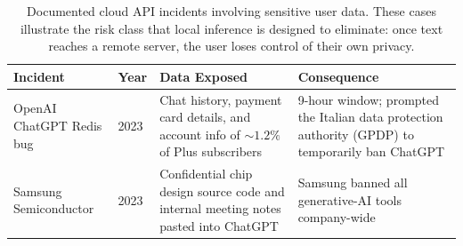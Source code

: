 \begin{table}[H]
\centering
\renewcommand{\arraystretch}{1.25}
\footnotesize
\begin{tabular}{p{3.2cm}p{1.2cm}p{4.8cm}p{4.2cm}}
\toprule
\textbf{Incident} & \textbf{Year} & \textbf{Data Exposed} & \textbf{Consequence} \\
\midrule
OpenAI ChatGPT Redis bug \cite{openai2023breach}
  & 2023
  & Chat history, payment card details, and account info of ${\sim}1.2\%$ of Plus subscribers
  & 9-hour window; prompted the Italian data protection authority (GPDP) to temporarily ban ChatGPT \\
Samsung Semiconductor \cite{bloomberg2023samsung}
  & 2023
  & Confidential chip design source code and internal meeting notes pasted into ChatGPT
  & Samsung banned all generative-AI tools company-wide \\
\bottomrule
\end{tabular}
\caption{Documented cloud API incidents involving sensitive user data. These cases illustrate the risk class that local inference is designed to eliminate: once text reaches a remote server, the user loses control of their own privacy.}
\label{tab:cloud-api-incidents}
\end{table}
